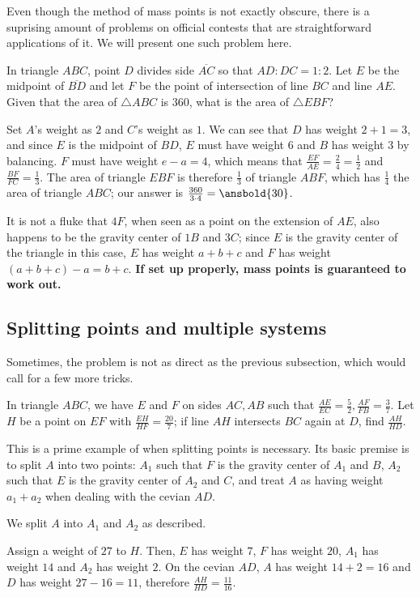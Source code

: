 \documentclass{article}
\begin{document}
\bigskip
Even though the method of mass points is not exactly obscure, there is a suprising amount of problems on official contests that are straightforward applications of it. We will present one such problem here.
\begin{exam}[AMC 8 2019/24]
In triangle $ABC$, point $D$ divides side $\overline{AC}$ so that $AD:DC=1:2$. Let $E$ be the midpoint of $\overline{BD}$ and let $F$ be the point of intersection of line $BC$ and line $AE$. Given that the area of $\triangle ABC$ is $360$, what is the area of $\triangle EBF$?
\end{exam}
\begin{sol}
Set $A$'s weight as $2$ and $C$'s weight as $1$. We can see that $D$ has weight $2+1=3$, and since $E$ is the midpoint of $BD$, $E$ must have weight $6$ and $B$ has weight $3$ by balancing. $F$ must have weight $e-a=4$, which means that $\frac{EF}{AE}=\frac{2}{4}=\frac{1}{2}$ and $\frac{BF}{FC}=\frac{1}{3}$. The area of triangle $EBF$ is therefore $\frac{1}{3}$ of triangle $ABF$, which has $\frac{1}{4}$ the area of triangle $ABC$; our answer is $\frac{360}{3\cdot 4}=\ansbold{30}$.
\end{sol}
\begin{remark}
It is not a fluke that $4F$, when seen as a point on the extension of $AE$, also happens to be the gravity center of $1B$ and $3C$; since $E$ is the gravity center of the triangle in this case, $E$ has weight $a+b+c$ and $F$ has weight $(a+b+c)-a=b+c$. \textbf{If set up properly, mass points is guaranteed to work out.}
\end{remark}
\subsection{Splitting points and multiple systems}
Sometimes, the problem is not as direct as the previous subsection, which would call for a few more tricks.
\begin{exam}
In triangle $ABC$, we have $E$ and $F$ on sides $AC,AB$ such that $\frac{AE}{EC}=\frac{5}{2},\frac{AF}{FB}=\frac{3}{7}$. Let $H$ be a point on $EF$ with $\frac{EH}{HF}=\frac{20}{7}$; if line $AH$ intersects $BC$ again at $D$, find $\frac{AH}{HD}$.
\end{exam}
This is a prime example of when splitting points is necessary. Its basic premise is to split $A$ into two points: $A_1$ such that $F$ is the gravity center of $A_1$ and $B$, $A_2$ such that $E$ is the gravity center of $A_2$ and $C$, and treat $A$ as having weight $a_1+a_2$ when dealing with the cevian $AD$.
\newpage
\begin{sol}
We split $A$ into $A_1$ and $A_2$ as described. 

Assign a weight of $27$ to $H$. Then, $E$ has weight $7$, $F$ has weight $20$, $A_1$ has weight $14$ and $A_2$ has weight $2$. On the cevian $AD$, $A$ has weight $14+2=16$ and $D$ has weight $27-16=11$, therefore $\frac{AH}{HD}=\frac{11}{16}$. 
\end{sol}
\end{document}
